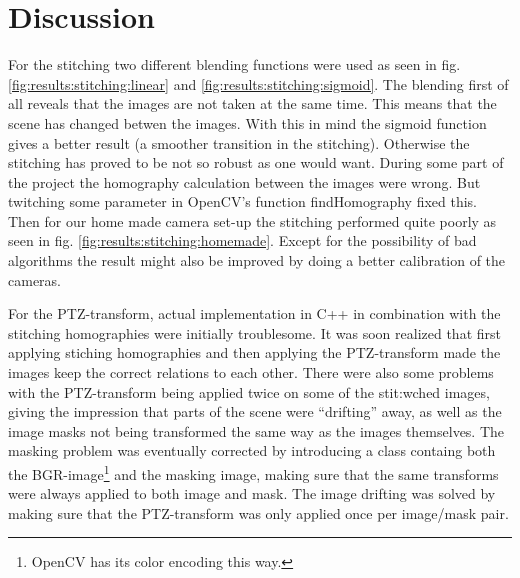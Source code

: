 \section{Discussion}
For the stitching two different blending functions were used as seen in fig. \ref{fig:results:stitching:linear} and \ref{fig:results:stitching:sigmoid}.
The blending first of all reveals that the images are not taken at the same time.
This means that the scene has changed betwen the images.
With this in mind the sigmoid function gives a better result (a smoother transition in the stitching).
Otherwise the stitching has proved to be not so robust as one would want.
During some part of the project the homography calculation between the images were wrong.
But twitching some parameter in OpenCV's function findHomography fixed this.
Then for our home made camera set-up the stitching performed quite poorly as seen in fig. \ref{fig:results:stitching:homemade}.
Except for the possibility of bad algorithms the result might also be improved by doing a better calibration of the cameras.

For the PTZ-transform, actual implementation in C++ in combination with the stitching homographies were initially troublesome.
It was soon realized that first applying stiching homographies and then applying the PTZ-transform made the images keep the correct relations to each other.
There were also some problems with the PTZ-transform being applied twice on some of the stit:wched images, giving the impression that parts of the scene were ``drifting'' away, as well as the image masks not being transformed the same way as the images themselves.
The masking problem was eventually corrected by introducing a class containg both the BGR-image\footnote{OpenCV has its color encoding this way.} and the masking image, making sure that the same transforms were always applied to both image and mask.
The image drifting was solved by making sure that the PTZ-transform was only applied once per image/mask pair.
